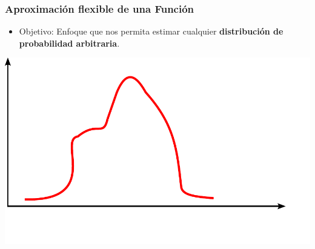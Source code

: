 \begin{frame}
    \frametitle{Aproximación flexible de una Función}
    \footnotesize
    
    \begin{itemize}
        \item Objetivo: Enfoque que nos permita estimar cualquier \textbf{distribución de probabilidad arbitraria}.
    \end{itemize}
    
    \begin{center}
    \includegraphics[width=0.5\columnwidth]{./images/particle_filter/arbitrary_distribution.pdf}
    \end{center}
    
\end{frame}

